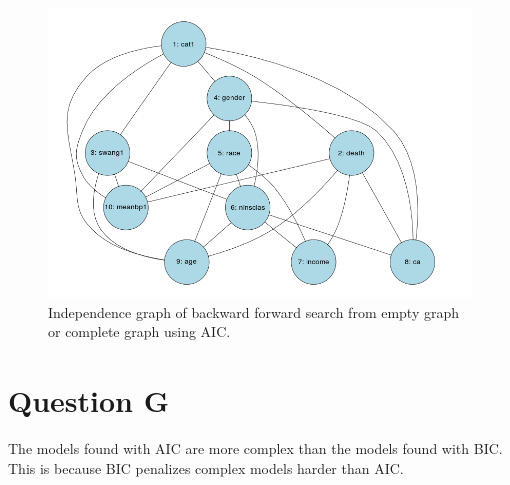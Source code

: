 \documentclass[12pt]{article}
\theoremstyle{definition}
\begin{document}
\begin{figure}[H]
    \centering
    \includegraphics[width=0.8\linewidth]{f.png}
    \caption{Independence graph of backward forward search from empty graph or complete graph using AIC.}
\label{fig:f}
\end{figure}






\section*{Question G}
The models found with AIC are more complex than the models found with BIC.
This is because BIC penalizes complex models harder than AIC.
\end{document}

